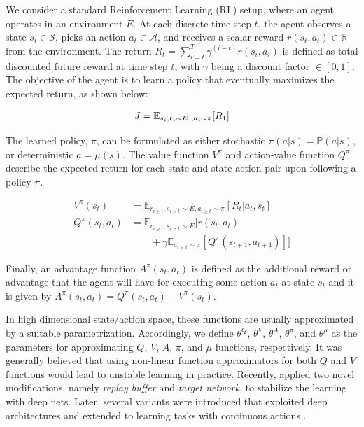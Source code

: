 \documentclass[../thesis.tex]{subfiles}
\begin{document}
 
We consider a standard Reinforcement Learning (RL) setup, where an agent operates in an environment ${E}$. At each discrete time step $t$, the agent observes a state $s_t \in \mathcal{S}$, picks an action $a_t \in \mathcal{A}$, and receives a scalar reward $r(s_t, a_t) \in \mathbb{R}$ from the environment. The return $R_t = \sum^T_{i=t} \gamma^{(i-t)}r(s_i,a_i)$ is defined as total discounted future reward at time step $t$, with $\gamma$ being a discount factor $\in [0,1]$. The objective of the agent is to learn a policy that eventually maximizes the expected return, as shown below:
 
\begin{align}
\centering
J = \mathbb{E}_{s_i, r_i \sim E~, a_i \sim \pi}[R_1] \label{equ:obj-func}
\end{align}
 
The learned policy, $\pi$, can be formulated as either stochastic $\pi(a|s) = \mathbb{P}(a|s)$, or deterministic $a = \mu(s)$. The value function $V^{\pi}$ and action-value function $Q^{\pi}$ describe the expected return for each state and state-action pair upon following a policy $\pi$.
 
\begin{align}
V^\pi(s_t) &= \mathbb{E}_{r_{i \geq t}, s_{i > t} \sim E, a_{i \geq t} \sim \pi} [R_t | a_t, s_t] \\
Q^\pi(s_t, a_t) &= \mathbb{E}_{r_{i \geq t}, s_{i > t} \sim E} [r(s_t, a_t) \nonumber \\
&\qquad + \gamma \mathbb{E}_{a_{i > t} \sim \pi} [Q^\pi(s_{t+1}, a_{t+1})]]
\end{align}
 
Finally, an advantage function $A^{\pi}(s_t,a_t)$ is defined as the additional reward or advantage that the agent will have for executing some action $a_t$ at state $s_t$ and it is given by $A^{\pi}(s_t,a_t) = Q^\pi(s_t, a_t) - V^\pi(s_t)$.
 
 
In high dimensional state/action space, these functions are usually approximated by a suitable parametrization. Accordingly, we define $\theta^Q$, $\theta^V$, $\theta^A$, $\theta^\pi$, and $\theta^\mu$ as the parameters for approximating $Q$, $V$, $A$, $\pi$, and $\mu$ functions, respectively. It was generally believed that using non-linear function approximators for both $Q$ and $V$ functions would lead to unstable learning in practice. Recently, \citet{mnih2013playing} applied two novel modifications, namely \textit{replay buffer} and \textit{target network}, to stabilize the learning with deep nets. Later, several variants were introduced that exploited deep architectures and extended to learning tasks with continuous actions \cite{DBLP:journals/corr/LillicrapHPHETS15,A3C,CDQN,TRPO}.
 
\end{document}
